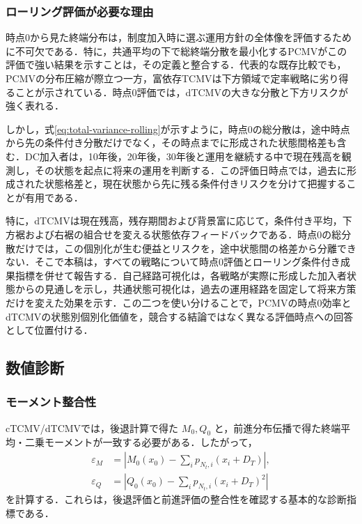 \documentclass[10pt,a4paper]{article}
\theoremstyle{plain}
\theoremstyle{definition}
\begin{document}
\subsubsection{ローリング評価が必要な理由}

時点0から見た終端分布は，制度加入時に選ぶ運用方針の全体像を評価するために不可欠である．特に，共通平均の下で総終端分散を最小化するPCMVがこの評価で強い結果を示すことは，その定義と整合する．代表的な既存比較でも，PCMVの分布圧縮が際立つ一方，富依存TCMVは下方領域で定率戦略に劣り得ることが示されている\citep{vanStadenDangForsyth2021}．時点0評価では，dTCMVの大きな分散と下方リスクが強く表れる．

しかし，式\eqref{eq:total-variance-rolling}が示すように，時点0の総分散は，途中時点から先の条件付き分散だけでなく，その時点までに形成された状態間格差も含む．DC加入者は，10年後，20年後，30年後と運用を継続する中で現在残高を観測し，その状態を起点に将来の運用を判断する．この評価日時点では，過去に形成された状態格差と，現在状態から先に残る条件付きリスクを分けて把握することが有用である．

特に，dTCMVは現在残高，残存期間および背景富に応じて，条件付き平均，下方裾および右裾の組合せを変える状態依存フィードバックである．時点0の総分散だけでは，この個別化が生む便益とリスクを，途中状態間の格差から分離できない．そこで本稿は，すべての戦略について時点0評価とローリング条件付き成果指標を併せて報告する．自己経路可視化は，各戦略が実際に形成した加入者状態からの見通しを示し，共通状態可視化は，過去の運用経路を固定して将来方策だけを変えた効果を示す．この二つを使い分けることで，PCMVの時点0効率とdTCMVの状態別個別化価値を，競合する結論ではなく異なる評価時点への回答として位置付ける．

\subsection{数値診断}
\label{sec:diagnostics}

\subsubsection{モーメント整合性}

cTCMV/dTCMVでは，後退計算で得た $M_0,Q_0$ と，前進分布伝播で得た終端平均・二乗モーメントが一致する必要がある．したがって，
\begin{align}
  \varepsilon_M&=
  \left|M_0(x_0)-\sum_i p_{N_t,i}(x_i+D_T)\right|,
  \label{eq:eps-M}\\
  \varepsilon_Q&=
  \left|Q_0(x_0)-\sum_i p_{N_t,i}(x_i+D_T)^2\right|
  \label{eq:eps-Q}
\end{align}
を計算する．これらは，後退評価と前進評価の整合性を確認する基本的な診断指標である．
\end{document}
